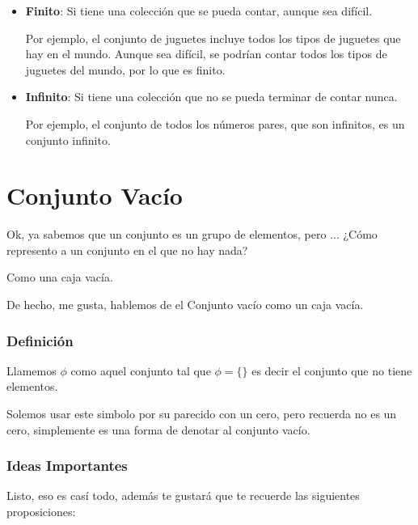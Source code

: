 \documentclass[12pt]{report}                                    %
\begin{document}
        \begin{itemize}
            \item \textbf{Finito}:
                Si tiene una colección que se pueda contar, aunque sea difícil.

                Por ejemplo, el conjunto de juguetes incluye todos los tipos de
                juguetes que hay en el mundo. Aunque sea difícil, se podrían contar
                todos los tipos de juguetes del mundo, por lo que es finito.

            \item \textbf{Infinito}:
                Si tiene una colección que no se pueda terminar de contar nunca.

                Por ejemplo, el conjunto de todos los números pares, que son
                infinitos, es un conjunto infinito.
        \end{itemize}


    \clearpage
    \section{Conjunto Vacío}
            
        Ok, ya sabemos que un conjunto es un grupo de elementos, pero ...
        ¿Cómo represento a un conjunto en el que no hay nada?

        Como una caja vacía.

        De hecho, me gusta, hablemos de el Conjunto vacío como un caja vacía.

        \subsubsection*{Definición}
        Llamemos $\phi$ como aquel conjunto tal que $\phi = \{ \}$ es decir el conjunto que no
        tiene elementos.

        Solemos usar este simbolo por su parecido con un cero, pero recuerda no es un cero, simplemente
        es una forma de denotar al conjunto vacío.

        \subsubsection*{Ideas Importantes}
        Listo, eso es casí todo, además te gustará que te recuerde las siguientes
        proposiciones:
\end{document}
